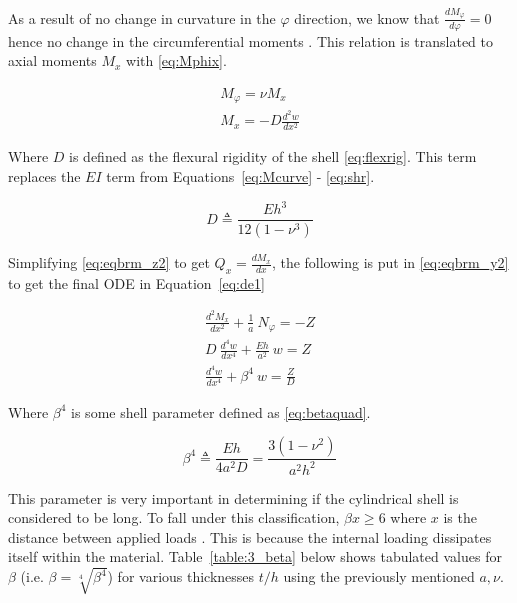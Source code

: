 As a result of no change in curvature in the $\varphi$ direction, we know that $\frac{dM_\varphi}{d\varphi}= 0$ hence no change in the circumferential moments \cite{timoshenko1959theory}. This relation is translated to axial moments $M_x$ with \ref{eq:Mphix}.

\begin{equation}
	\label{eq:Mphix}
	\begin{aligned}
		M_\varphi = \nu M_x        \\
		M_x = -D \frac{d^2w}{dx^2} 
	\end{aligned}
\end{equation}

Where $D$ is defined as the flexural rigidity of the shell \ref{eq:flexrig}. This term replaces the $EI$ term from Equations~\ref{eq:Mcurve} - \ref{eq:shr}.

\begin{equation}
	\label{eq:flexrig}
	D \triangleq \frac{Eh^3}{12(1-\nu^3)}
\end{equation}

Simplifying \ref{eq:eqbrm_z2} to get $Q_x = \frac{dM_x}{dx}$, the following is put in \ref{eq:eqbrm_y2} to get the final ODE in Equation~\ref{eq:de1}

\begin{equation}
	\label{eq:de1}
	\begin{aligned}
		\frac{d^2M_x}{dx^2}+\frac{1}{a} \ N_\varphi = -Z \\
		D\ \frac{d^4w}{dx^4}+\frac{Eh}{a^2} \ w = Z      \\
		\frac{d^4w}{dx^4}+\beta^4 \ w = \frac{Z}{D}      
	\end{aligned}
\end{equation} 

Where $\beta^4$ is some shell parameter defined as \ref{eq:betaquad}.

\begin{equation}
	\label{eq:betaquad}
	\beta^4 \triangleq \frac{Eh}{4a^2D}= \frac{3(1-\nu^2)}{a^2h^2}
\end{equation}

This parameter is very important in determining if the cylindrical shell is considered to be long. To fall under this classification, $\beta x \geq 6$ where $x$ is the distance between applied loads \cite{timoshenko1959theory}. This is because the internal loading dissipates itself within the material. Table~\ref{table:3_beta} below shows tabulated values for $\beta$ (i.e. $\beta = \sqrt[4]{\beta^4}$) for various thicknesses $t/h$ using the previously mentioned $a, \nu$.


